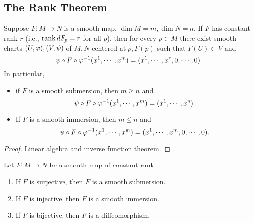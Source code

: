 \subsection{The Rank Theorem}
\begin{theorem}
    Suppose $F:M \to N$ is a smooth map, $\dim M = m, \dim N = n$. If $F$ has constant rank $r$ (i.e., $\rank dF_p = r$ for all $p$). then for every $p \in M$ there exist smooth charts $(U,\varphi), (V,\psi)$ of $M,N$ centered at $p, F(p)$ such that $F(U) \subset V$ and 
    $$\psi \circ F \circ \varphi^{-1}(x^1, \cdots, x^m) = (x^1, \cdots, x^r, 0, \cdots, 0). $$
    In particular, 
    \begin{itemize}
    \item if $F$ is a smooth submersion, then $m \geq n$ and 
    $$\psi \circ F \circ \varphi^{-1}(x^1, \cdots, x^m) = (x^1, \cdots, x^n). $$
    \item If $F$ is a smooth immersion, then $m \leq n$ and 
    $$\psi \circ F \circ \varphi^{-1}(x^1, \cdots, x^m) = (x^1, \cdots, x^m, 0, \cdots, 0). $$
    \end{itemize}
\end{theorem}
\begin{proof}
    Linear algebra and inverse function theorem. 
\end{proof}



\begin{theorem}
    Let $F:M \to N$ be a smooth map of constant rank. 
    \begin{enumerate}
    \item If $F$ is surjective, then $F$ is a smooth submersion.
    \item If $F$ is injective, then $F$ is a smooth immersion. 
    \item If $F$ is bijective, then $F$ is a diffeomorphism. 
    \end{enumerate}
\end{theorem}

